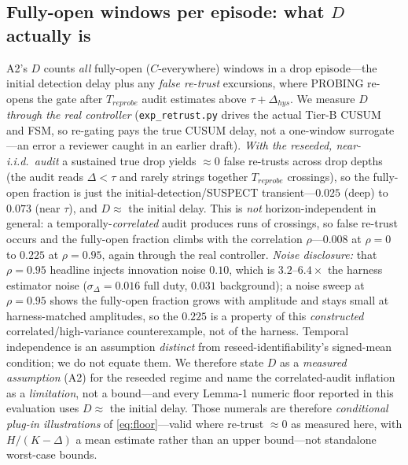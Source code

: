 \documentclass{article}
\newcommand{\sigd}{\sigma_{\Delta}}
\begin{document}
\subsection{Fully-open windows per episode: what $D$ actually is}\label{sec:eval-retrust}
A2's $D$ counts \emph{all} fully-open ($C$-everywhere) windows in a drop episode---the initial
detection delay plus any \emph{false re-trust} excursions, where PROBING re-opens the gate after
$T_{reprobe}$ audit estimates above $\tau+\Delta_{hys}$. We measure $D$ \emph{through the real
controller} (\texttt{exp\_retrust.py} drives the actual Tier-B CUSUM and FSM, so re-gating pays the
true CUSUM delay, not a one-window surrogate---an error a reviewer caught in an earlier draft).
\emph{With the reseeded, near-i.i.d.\ audit} a sustained true drop yields $\approx\!0$ false
re-trusts across drop depths (the audit reads $\Delta<\tau$ and rarely strings together
$T_{reprobe}$ crossings), so the fully-open fraction is just the initial-detection/SUSPECT
transient---$0.025$ (deep) to $0.073$ (near $\tau$), and $D\approx$ the initial delay. This is
\emph{not} horizon-independent in general: a temporally-\emph{correlated} audit produces
runs of crossings, so false re-trust occurs and the fully-open fraction climbs with the correlation
$\rho$---$0.008$ at $\rho{=}0$ to $0.225$ at $\rho{=}0.95$, again through the real controller.
\emph{Noise disclosure:} that $\rho{=}0.95$ headline injects innovation noise $0.10$, which is
$3.2$--$6.4\times$ the harness estimator noise ($\sigd{=}0.016$ full duty, $0.031$ background); a
noise sweep at $\rho{=}0.95$ shows the fully-open fraction grows with amplitude and stays small at
harness-matched amplitudes, so the $0.225$ is a property of this \emph{constructed}
correlated/high-variance counterexample, not of the harness. Temporal independence is an
assumption \emph{distinct} from reseed-identifiability's signed-mean condition; we do not equate
them. We therefore state $D$ as a \emph{measured
assumption} (A2) for the reseeded regime and name the correlated-audit inflation as a
\emph{limitation}, not a bound---and every Lemma-1 numeric floor reported in this evaluation
uses $D\approx$ the initial delay. Those numerals are therefore \emph{conditional plug-in
illustrations} of \cref{eq:floor}---valid where re-trust $\approx0$ as measured here, with
$H/(K-\Delta)$ a mean estimate rather than an upper bound---not standalone worst-case bounds.
\end{document}
